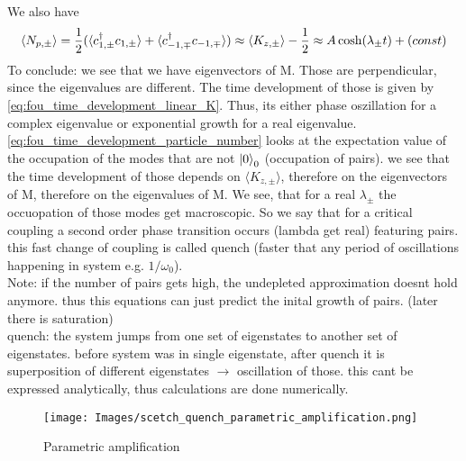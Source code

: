 We also have
\begin{equation}\label{eq:fou_time_development_particle_number}
	\langle N_{p,\pm} \rangle = \frac{1}{2} (\langle c_{1,\pm}^\dag c_{1,\pm} \rangle + \langle c_{-1,\mp}^\dag c_{-1,\mp}\rangle ) \approx \langle K_{z,\pm} \rangle - \frac{1}{2} \approx A\cosh(\lambda_\pm t) + \text(const)
\end{equation}
To conclude: we see that we have eigenvectors of M. Those are perpendicular, since the eigenvalues are different. The time development of those is given by \ref{eq:fou_time_development_linear_K}. Thus, its either phase oszillation for a complex eigenvalue or exponential growth for a real eigenvalue. \ref{eq:fou_time_development_particle_number} looks at the expectation value of the occupation of the modes that are not $\ket{0}_0$ (occupation of pairs). we see that the time development of those depends on $ \langle K_{z,\pm} \rangle$, therefore on the eigenvectors of M, therefore on the eigenvalues of M. We see, that for a real $\lambda_\pm$ the occuopation of those modes get macroscopic. So we say that for a critical coupling a second order phase transition occurs (lambda get real) featuring pairs. this fast change of coupling is called quench (faster that any period of oscillations happening in system e.g. $1/\omega_0$). 
\\
Note: if the number of pairs gets high, the undepleted approximation doesnt hold anymore. thus this equations can just predict the inital growth of pairs. (later there is saturation)
\\
quench: the system jumps from one set of eigenstates to another set of eigenstates. before system was in single eigenstate, after quench it is superposition of different eigenstates $\rightarrow$ oscillation of those. this cant be expressed analytically, thus calculations are done numerically. 
\begin{figure}[h!]
	\centering
	\texttt{[image: Images/scetch\_quench\_parametric\_amplification.png]}
	\caption{Parametric amplification}
	\label{fig:scetch_quench_parametric_amplification}
\end{figure}
